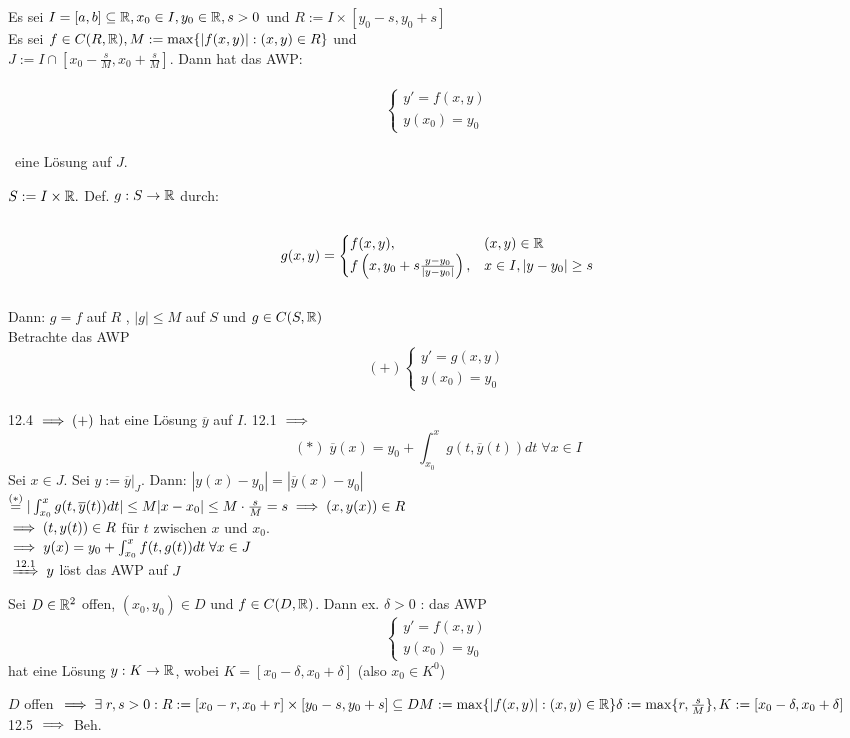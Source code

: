 \documentclass{article}
\begin{document}
\begin{satz}
Es sei $I = [a,b] \subseteq \mathbb{R}, x_0 \in I, y_0 \in \mathbb{R}, s > 0$ und $R:=I \times [y_0-s, y_0+s]$ \\
Es sei $f \in C(R,\mathbb{R}), M := \max \{ |f(x,y)| : (x,y) \in R \}$ und \\
$J := I \cap [x_0-\frac{s}{M},x_0+\frac{s}{M}].$ Dann hat das AWP:
\\\ $$\begin{cases} y' = f(x,y) \\ y(x_0) = y_0 \end{cases}$$ \\\ eine Lösung auf $J$.
\end{satz}

\begin{beweis}
$S := I \times \mathbb{R}.$ Def. $g: S \rightarrow \mathbb{R}$ durch: \\
\ $$ g(x,y) = \begin{cases} f(x,y), & (x,y) \in \mathbb{R} \\ f\left(x, y_0 + s \frac {y - y_0}{|y - y_0|}\right), & x \in I, |y - y_0| \geq s\end{cases}$$ \\
Dann: $g = f$ auf $R$ , $|g| \leq M$ auf $S$ und $g \in C(S,\mathbb{R})$ \\
Betrachte das AWP \\ $$(+)\begin{cases} y'= g(x,y) \\ y(x_0) = y_0 \end{cases}$$ \\
12.4 $\implies (+)$ hat eine Lösung $\overline{y}$ auf $I$. 12.1 $\implies$ \\
$$ (*) \; \overline{y}(x) = y_0 + \int_{x_0}^{x}g(t,\overline{y}(t)) dt \; \forall x \in I $$
Sei $x \in J.$ Sei $y := \overline{y}|_J.$ Dann: $|y(x) - y_0| = |\overline{y}(x) - y_0|$ \\
$\stackrel{(*)}{=} | \int_{x_0}^{x} g(t,\overline{y}(t)) dt | \leq M |x - x_0| \leq M \cdot \frac{s}{M} = s 
\implies (x,y(x)) \in R$ \\
$\implies (t,y(t)) \in R$ für $t$ zwischen $x$ und $x_0$. \\
$\implies y(x) = y_0 + \int_{x_0}^{x} f(t,g(t)) dt \; \forall x \in J$ \\
$\folgtnach{12.1} y$ löst das AWP auf $J$
\end{beweis}

\begin{satz}
Sei $D \in \mathbb{R}^{2}$ offen, $(x_0,y_0) \in D$ und $f \in C(D, \mathbb{R})$. Dann ex. $\delta > 0$ : das AWP
$$\begin{cases} y' = f(x,y) \\ y(x_0) = y_0 \end{cases}$$
hat eine Lösung $y: K \rightarrow \mathbb{R}$, wobei $K = [x_0 - \delta, x_0 + \delta]$ (also $x_0 \in K^{0}$)
\end{satz} 

\begin{beweis}
$D$ offen $\implies \exists \; r, s > 0 : R := [x_0 - r, x_0 + r] \times [y_0 - s, y_0 + s] \subseteq D \\
M := \max \{|f(x,y)| : (x,y) \in \mathbb{R} \} \\
\delta := \max \{r, \frac {s}{M}\}, K := [x_0 - \delta, x_0 + \delta]$ 12.5 $\implies$ Beh.
\end{beweis}
\end{document}
